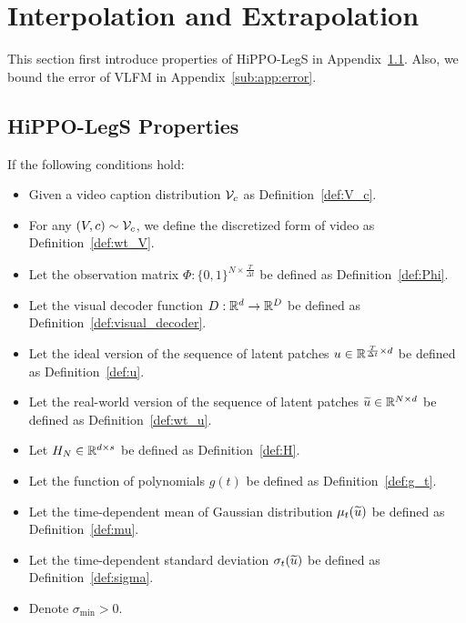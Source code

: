 \section{Interpolation and Extrapolation}
\label{sec:app:inter_extra}

This section first introduce properties of HiPPO-LegS in Appendix~\ref{sub:app:hippo_property}. Also, we bound the error of VLFM in Appendix~\ref{sub:app:error}.

\subsection{HiPPO-LegS Properties} \label{sub:app:hippo_property}

\begin{lemma}\label{lem:optimal_projs}
    If the following conditions hold:
    \begin{itemize}
        \item Given a video caption distribution ${\cal V}_c$ as Definition~\ref{def:V_c}.
        \item For any $(V, c) \sim {\cal V}_c$, we define the discretized form of video as Definition~\ref{def:wt_V}.
        \item Let the observation matrix $\Phi: \{0, 1\}^{N \times \frac{T}{\Delta t}}$ be defined as Definition~\ref{def:Phi}.
        \item Let the visual decoder function $D: \mathbb{R}^d \rightarrow \mathbb{R}^D$ be defined as Definition~\ref{def:visual_decoder}.
        \item Let the ideal version of the sequence of latent patches $u \in \mathbb{R}^{\frac{T}{\Delta t} \times d}$ be defined as Definition~\ref{def:u}.
        \item Let the real-world version of the sequence of latent patches $\widetilde{u} \in \mathbb{R}^{N \times d}$ be defined as Definition~\ref{def:wt_u}.
        \item Let $H_N \in \mathbb{R}^{d \times s}$ be defined as Definition~\ref{def:H}.
        \item Let the function of polynomials $g(t)$ be defined as Definition~\ref{def:g_t}.
        \item Let the time-dependent mean of Gaussian distribution $\mu_t(\widetilde{u})$ be defined as Definition~\ref{def:mu}.
        \item Let the time-dependent standard deviation $\sigma_t(\widetilde{u})$ be defined as Definition~\ref{def:sigma}.
        \item Denote $\sigma_{\min} > 0$.

\end{itemize}
\end{lemma}
